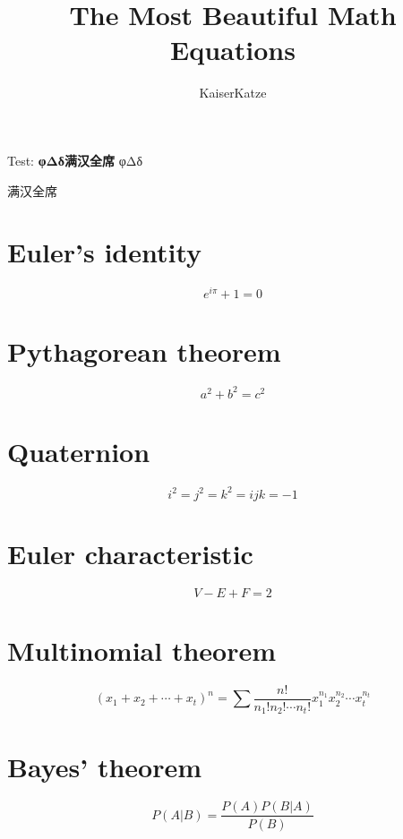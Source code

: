 \documentclass[12pt,twoside]{article}
\title{The Most Beautiful Math Equations}
\author{KaiserKatze}
\begin{document}
Test:
\textbf{φΔδ满汉全席}
\foreignlanguage{greek}{φΔδ}\begin{CJK}{UTF8}{gbsn}满汉全席\end{CJK}

\maketitle

\section{Euler's identity}

$$ e^{i \pi} + 1 = 0 $$

\section{Pythagorean theorem}

$$ a^2 + b^2 = c^2 $$

\section{Quaternion}

$$ i^2 = j^2 = k^2 = ijk = -1 $$

\section{Euler characteristic}

$$ V - E + F = 2 $$

\section{Multinomial theorem}

$$ (x_1+x_2+\cdots+x_t)^n=\sum\frac{n!}{n_1!n_2!\cdots n_t!}x_1^{n_1}x_2^{n_2}\cdots x_t^{n_t} $$

\section{Bayes' theorem}

$$ P\left(A|B\right) = \frac{P\left(A\right)P\left(B|A\right)}{P\left(B\right)} $$
\end{document}
